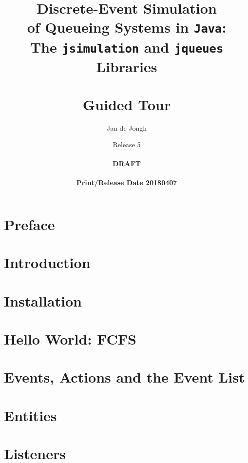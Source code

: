 \documentclass[12pt]{book}
\title{Discrete-Event Simulation\\
       of Queueing Systems in \texttt{Java}:\\
       The \texttt{jsimulation}
       and
       \texttt{jqueues}
       Libraries\\
       \mbox{ } \\
       Guided Tour}
\author{Jan de Jongh}
\date{Release 5\\
	  \mbox{ } \\
	  {\bf DRAFT}\\
	  \mbox{ }
	  \\{\bf Print/Release Date 20180407}}
\begin{document}
\maketitle


\chapter*{Preface}
\label{chap:preface}


\chapter{Introduction}
\label{chap:intro}


\chapter{Installation}
\label{chap:install}


\chapter{Hello World: FCFS}
\label{chap:hello-world}


\chapter{Events, Actions and the Event List}
\label{chap:events-actions-event-list}


\chapter{Entities}
\label{chap:entities}


\chapter{Listeners}
\label{chap:listeners}

\end{document}
